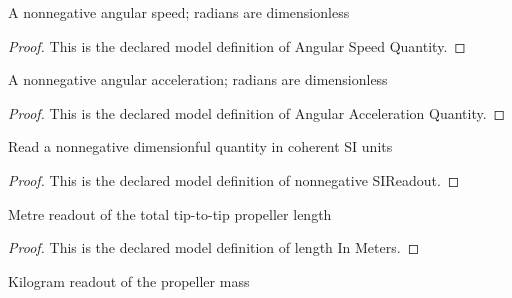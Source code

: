 \begin{definition}
  \label{def:physics:phyx-mini-0704:phyxminiproblems-problemphyxmini0704-angularspeedquantity}
  A nonnegative angular speed; radians are dimensionless
\end{definition}
\begin{proof}
  This is the declared model definition of Angular Speed Quantity.
\end{proof}
\begin{definition}
  \label{def:physics:phyx-mini-0704:phyxminiproblems-problemphyxmini0704-angularaccelerationquantity}
  A nonnegative angular acceleration; radians are dimensionless
\end{definition}
\begin{proof}
  This is the declared model definition of Angular Acceleration Quantity.
\end{proof}
\begin{definition}
  \label{def:physics:phyx-mini-0704:phyxminiproblems-problemphyxmini0704-nonnegativesireadout}
  Read a nonnegative dimensionful quantity in coherent SI units
\end{definition}
\begin{proof}
  This is the declared model definition of nonnegative SIReadout.
\end{proof}
\begin{definition}
  \label{def:physics:phyx-mini-0704:phyxminiproblems-problemphyxmini0704-lengthinmeters}
  Metre readout of the total tip-to-tip propeller length
\end{definition}
\begin{proof}
  This is the declared model definition of length In Meters.
\end{proof}
\begin{definition}
  \label{def:physics:phyx-mini-0704:phyxminiproblems-problemphyxmini0704-massinkilograms}
  Kilogram readout of the propeller mass
\end{definition}
